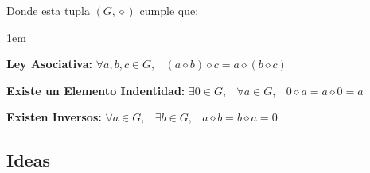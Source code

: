 \documentclass[12pt, fleqn]{report}                             %
\newenvironment{Indentation}[1][0.75em]                         %
        {\begin{adjustwidth}{#1}{}}                                 %
        {\end{adjustwidth}}                                         %
\DeclareMathOperator \Space     {\quad}                         %
\DeclareMathOperator \MiniSpace {\;}                            %
\theoremstyle{break}                                            %
\begin{document}
                Donde esta tupla $(G, \diamond)$ cumple que:
                \begin{Indentation}[1em]
                \begin{itemize}
                \small{
                    
                    \item 
                        \textbf{Ley Asociativa:}
                        $\forall a, b, c \in G, \MiniSpace
                            (a \diamond b) \diamond c = a \diamond (b \diamond c)$

                    \item 
                        \textbf{Existe un Elemento Indentidad:}
                        $\exists 0 \in G, \MiniSpace
                            \forall a \in G, \MiniSpace 0 \diamond a = a \diamond 0 = a$

                    \item 
                        \textbf{Existen Inversos:}
                        $\forall a \in G, \MiniSpace
                                \exists b \in G, \MiniSpace
                                    a \diamond b = b \diamond a = 0$

                }
                \end{itemize}
                \end{Indentation}

           
            \subsection{Ideas}
\end{document}

